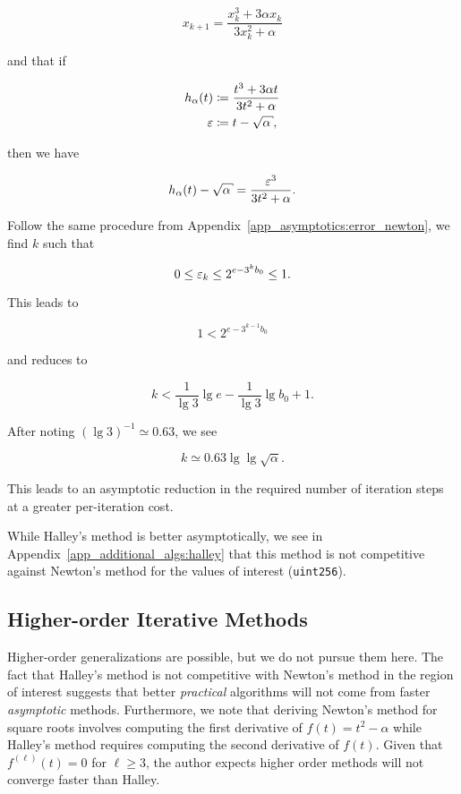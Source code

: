 \begin{equation}
    x_{k+1} = \frac{x_{k}^{3} + 3\alpha x_{k}}{3x_{k}^{2} + \alpha}
\end{equation}

\noindent
and that if

\begin{align}
    h_{\alpha}(t) &\algAssign{} \frac{t^{3} + 3\alpha t}{3t^{2} + \alpha}
        \nonumber\\
    \eps &\algAssign{} t - \sqrt{\alpha},
\end{align}

\noindent
then we have

\begin{equation}
    h_{\alpha}(t) - \sqrt{\alpha}= \frac{\eps^{3}}{3t^{2} + \alpha}.
\end{equation}

Follow the same procedure from Appendix~\ref{app_asymptotics:error_newton},
we find $k$ such that

\begin{equation}
    0 \le \varepsilon_{k} \le 2^{e-3^{k}b_{0}} \le 1.
\end{equation}

\noindent
This leads to

\begin{equation}
    1 <  2^{e-3^{k-1}b_{0}}
\end{equation}

\noindent
and reduces to

\begin{equation}
    k < \frac{1}{\lg 3}\lg e - \frac{1}{\lg 3}\lg b_{0} + 1.
\end{equation}

\noindent
After noting $(\lg 3)^{-1}\simeq 0.63$, we see

\begin{equation}
    k \simeq 0.63\lg\lg \sqrt{\alpha}.
\end{equation}

\noindent
This leads to an asymptotic reduction in the required number of iteration steps
at a greater per-iteration cost.

While Halley's method is better asymptotically,
we see in Appendix~\ref{app_additional_algs:halley}
that this method is not competitive against Newton's method
for the values of interest (\texttt{uint256}).


\subsection{Higher-order Iterative Methods}

Higher-order generalizations are possible,
but we do not pursue them here.
The fact that Halley's method is not competitive with Newton's method
in the region of interest suggests
that better \emph{practical} algorithms will not come from
faster \emph{asymptotic} methods.
Furthermore, we note that deriving Newton's method for square roots
involves computing the first derivative of $f(t) = t^{2} - \alpha$
while Halley's method requires computing the second derivative of $f(t)$.
Given that $f^{(\ell)}(t) = 0$ for $\ell\ge3$,
the author expects higher order methods will not converge faster than Halley.
